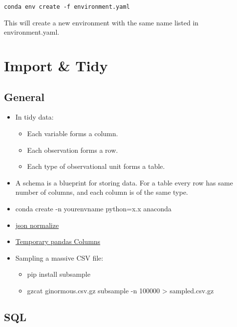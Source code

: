 \documentclass[]{book}
\providecommand{\tightlist}{%
  \setlength{\itemsep}{0pt}\setlength{\parskip}{0pt}}
\theoremstyle{definition}
\theoremstyle{definition}
\theoremstyle{definition}
\theoremstyle{remark}
\begin{document}
\texttt{conda\ env\ create\ -f\ environment.yaml}

This will create a new environment with the same name listed in
environment.yaml.

\chapter{Import \& Tidy}\label{import-tidy}

\section{General}\label{general}

\begin{itemize}
\item
  In tidy data:

  \begin{itemize}
  \tightlist
  \item
    Each variable forms a column.
  \item
    Each observation forms a row.
  \item
    Each type of observational unit forms a table.
  \end{itemize}
\item
  A schema is a blueprint for storing data. For a table every row has
  same number of columns, and each column is of the same type.
\item
  conda create -n yourenvname python=x.x anaconda
\item
  \href{http://pandas.pydata.org/pandas-docs/stable/generated/pandas.io.json.json_normalize.html}{json
  normalize}
\item
  \href{https://github.com/jreback/PyDataNYC2015/blob/master/whats-new-in-pandas/v0.16.x.ipynb}{Temporary
  pandas Columns}
\item
  Sampling a massive CSV file:

  \begin{itemize}
  \item
    pip install subsample
  \item
    gzcat ginormous.csv.gz \textbar{} subsample -n 100000 \textgreater{}
    sampled.csv.gz
  \end{itemize}
\end{itemize}

\section{SQL}\label{sql}
\end{document}
